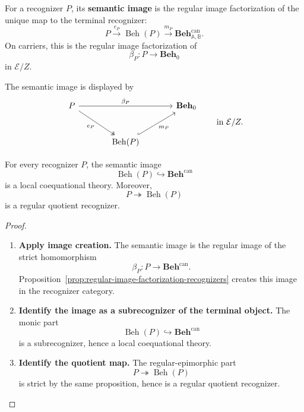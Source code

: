 \begin{definition}
\label{def:semantic-image}
    For a recognizer \(P\), its \textbf{semantic image} is the regular image
    factorization of the unique map to the terminal recognizer:
    \[
        P\xrightarrow{e_P}\operatorname{Beh}(P)
        \xrightarrow{m_P}
        \mathbf{Beh}^{\mathrm{can}}_{\mathbb A,\mathbb B}.
    \]
    On carriers, this is the regular image factorization of
    \[
        \beta_P:P\to\mathbf{Beh}_0
    \]
    in \(\mathcal E/Z\).
\end{definition}

The semantic image is displayed by
\[
\begin{tikzcd}[column sep=large, row sep=large]
    P
        \arrow[rr, "\beta_P"]
        \arrow[dr, two heads, "e_P"']
    &&
    \mathbf{Beh}_0
    \\
    &
    \operatorname{Beh}(P)
        \arrow[ur, hook, "m_P"']
    &
\end{tikzcd}
\qquad
\text{in }\mathcal E/Z.
\]

\begin{corollary}
\label{cor:semantic-images-are-coeq-theories}
    For every recognizer \(P\), the semantic image
    \[
        \operatorname{Beh}(P)\hookrightarrow\mathbf{Beh}^{\mathrm{can}}
    \]
    is a local coequational theory. Moreover,
    \[
        P\twoheadrightarrow\operatorname{Beh}(P)
    \]
    is a regular quotient recognizer.
\end{corollary}

\begin{proof}
    \leavevmode
    \begin{enumerate}
        \item \textbf{Apply image creation.}
        The semantic image is the regular image of the strict homomorphism
        \[
            \beta_P:P\to\mathbf{Beh}^{\mathrm{can}}.
        \]
        Proposition~\ref{prop:regular-image-factorization-recognizers} creates
        this image in the recognizer category.

        \item \textbf{Identify the image as a subrecognizer of the terminal object.}
        The monic part
        \[
            \operatorname{Beh}(P)\hookrightarrow\mathbf{Beh}^{\mathrm{can}}
        \]
        is a subrecognizer, hence a local coequational theory.

        \item \textbf{Identify the quotient map.}
        The regular-epimorphic part
        \[
            P\twoheadrightarrow\operatorname{Beh}(P)
        \]
        is strict by the same proposition, hence is a regular quotient
        recognizer.
    \end{enumerate}
\end{proof}

